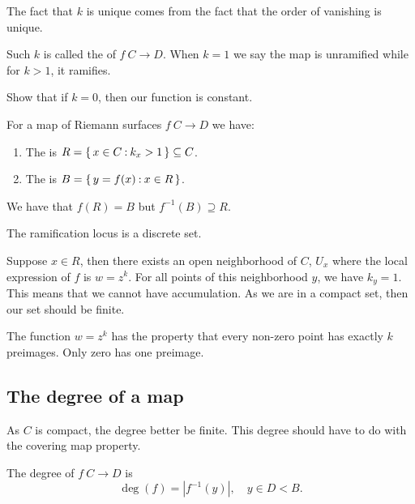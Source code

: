 \documentclass[12pt]{memoir}
\begin{document}
The fact that $k$ is unique comes from the fact that the order of vanishing is unique.

\begin{Def}
    Such $k$ is called the  of $f\: C\to D$. When $k=1$ we say the map is unramified while for $k>1$, it ramifies.
\end{Def}

\begin{Ej}
    Show that if $k=0$, then our function is constant.
\end{Ej}

\begin{Def}
    For a map of Riemann surfaces $f\: C\to D$ we have:
    \begin{enumerate}
        \item The  is $R=\{\,x\in C\mathbin{:} k_x>1\,\}\subseteq C$.
        \item The  is $B=\{\,y=f(x)\mathbin{:} x\in R\,\}$.
    \end{enumerate}
\end{Def}

We have that $f(R)=B$ but $f^{-1}(B)\supseteq R$. 

\begin{Th}
The ramification locus is a discrete set.
\end{Th}

\begin{ptcbp}
    Suppose $x\in R$, then there exists an open neighborhood of $C$, $U_x$ where the local expression of $f$ is $w=z^k$. For all points of this neighborhood $y$, we have $k_y=1$. This means that we cannot have accumulation. As we are in a compact set, then our set should be finite.
\end{ptcbp}

\begin{Rmk}
    The function $w=z^k$ has the property that every non-zero point has exactly $k$ preimages. Only zero has one preimage.
\end{Rmk}

\subsection{The degree of a map}

As $C$ is compact, the degree better be finite. This degree should have to do with the covering map property.

\begin{Def}
    The degree of $f\: C\to D$ is 
    $$\deg(f)=|f^{-1}(y)|,\quad y\in D\less B.$$
\end{Def}
\end{document}

